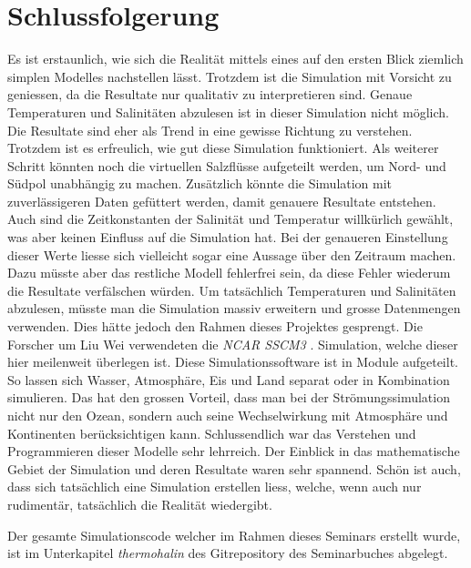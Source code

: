 \section{Schlussfolgerung}

Es ist erstaunlich, wie sich die Realität mittels eines auf den ersten Blick ziemlich simplen Modelles nachstellen lässt. Trotzdem ist die Simulation mit Vorsicht zu geniessen, da die Resultate nur qualitativ zu interpretieren sind. Genaue Temperaturen und Salinitäten abzulesen ist in dieser Simulation nicht möglich. Die Resultate sind eher als Trend in eine gewisse Richtung zu verstehen. Trotzdem ist es erfreulich, wie gut diese Simulation funktioniert. 
Als weiterer Schritt könnten noch die virtuellen Salzflüsse aufgeteilt werden, um Nord- und Südpol unabhängig zu machen. Zusätzlich könnte die Simulation mit zuverlässigeren Daten gefüttert werden, damit genauere Resultate entstehen. Auch sind die Zeitkonstanten der Salinität und Temperatur willkürlich gewählt, was aber keinen Einfluss auf die Simulation hat. Bei der genaueren Einstellung dieser Werte liesse sich vielleicht sogar eine Aussage über den Zeitraum machen. Dazu müsste aber das restliche Modell fehlerfrei sein, da diese Fehler wiederum die Resultate verfälschen würden.
Um tatsächlich Temperaturen und Salinitäten abzulesen, müsste man die Simulation massiv erweitern und grosse Datenmengen verwenden. Dies hätte jedoch den Rahmen dieses Projektes gesprengt. 
Die Forscher um Liu Wei \cite{thermohalin:liuwei} verwendeten die {\em NCAR SSCM3} \cite{thermohalin:sim}. Simulation, welche dieser hier meilenweit überlegen ist. Diese Simulationssoftware ist in Module aufgeteilt. So lassen sich Wasser, Atmosphäre, Eis und Land separat oder in Kombination simulieren. Das hat den grossen Vorteil, dass man bei der Strömungssimulation nicht nur den Ozean, sondern auch seine Wechselwirkung mit Atmosphäre und Kontinenten berücksichtigen kann. 
Schlussendlich war das Verstehen und Programmieren dieser Modelle sehr lehrreich. Der Einblick in das mathematische Gebiet der Simulation und deren Resultate waren sehr spannend. Schön ist auch, dass sich tatsächlich eine Simulation erstellen liess, welche, wenn auch nur rudimentär, tatsächlich die Realität wiedergibt.

Der gesamte Simulationscode welcher im Rahmen dieses Seminars erstellt wurde, ist im Unterkapitel {\em thermohalin} des Gitrepository des Seminarbuches abgelegt\cite{thermohalin:gitrepo-klimawandel}.
